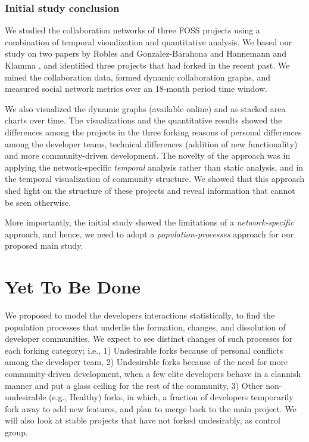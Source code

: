 \documentclass{acm_proc_article-sp}
\begin{document}
\subsubsection{Initial study conclusion}
We studied the collaboration networks of three FOSS projects using a combination of temporal visualization and quantitative analysis. We based our study on two papers by Robles and Gonzalez-Barahona \cite{Robles} and Hannemann and Klamma \cite{Hannemann}, and identified three projects that had forked in the recent past. We mined the collaboration data, formed dynamic collaboration graphs, and measured social network metrics over an 18-month period time window.

We also visualized the dynamic graphs (available online) and as stacked area charts over time. The visualizations and the quantitative results showed the differences among the projects in the three forking reasons of personal differences among the developer teams, technical differences (addition of new functionality) and more community-driven development. The novelty of the approach was in applying the network-specific \textit{temporal} analysis rather than static analysis, and in the temporal visualization of community structure. We showed that this approach shed light on the structure of these projects and reveal information that cannot be seen otherwise.

More importantly, the initial study showed the limitations of a \textit{network-specific} approach, and hence, we need to adopt a \textit{population-processes} approach for our proposed main study.

\section{Yet To Be Done}
\label{YetToBeDone}

We proposed to model the developers interactions statistically, to find the population processes that underlie the formation, changes, and dissolution of developer communities. We expect to see distinct changes of such processes for each forking category; i.e., 1) Undesirable forks because of personal conflicts among the developer team, 2) Undesirable forks because of the need for more community-driven development, when a few elite developers behave in a clannish manner and put a glass ceiling for the rest of the community, 3) Other non-undesirable (e.g., Healthy) forks, in which, a fraction of developers temporarily fork away to add new features, and plan to merge back to the main project. We will also look at stable projects that have not forked undesirably, as control group. 
\end{document}
